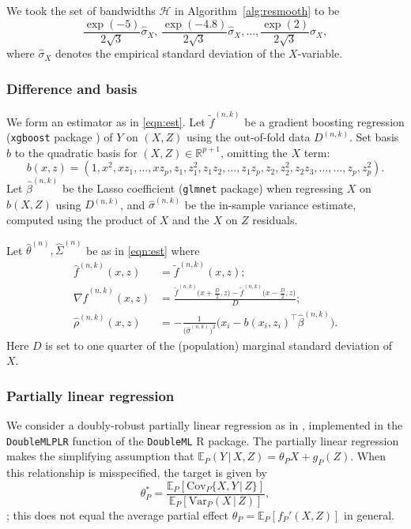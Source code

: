 \documentclass[aos]{imsart}
\newcommand{\R}{\mathbb{R}}
\newcommand{\E}{\mathbb{E}}
\newcommand{\Cov}{\mathrm{Cov}}
\newcommand{\Var}{\mathrm{Var}}
\newcommand{\given}{\,|\,}
\begin{document}
	We took the set of bandwidths $\mathcal{H}$ in Algorithm~\ref{alg:resmooth} to be
	\[
	\frac{\exp(-5)}{2\sqrt{3}} \hat{\sigma}_X, \, \frac{\exp(-4.8)}{2\sqrt{3}} \hat{\sigma}_X, \ldots, \frac{\exp(2)}{2\sqrt{3}} \hat{\sigma}_X,
	\]
	where $\hat{\sigma}_X$ denotes the empirical standard deviation of the $X$-variable.
	
	\subsubsection{Difference and basis}
	\label{sect:methodchern}
	
	We form an estimator as in \eqref{eqn:est}. Let $\tilde f^{(n,k)}$ be a gradient boosting regression (\texttt{xgboost} package \citep{xgboost}) of $Y$ on $(X,Z)$ using the out-of-fold data $D^{(n,k)}$. Set basis $b$ to the quadratic basis for $(X,Z)\in\R^{p+1}$, omitting the $X$ term:\begin{equation*}
		b(x,z) = (1, x^2, x z_1, \ldots,x z_{p}, z_1, z_1^2, z_1 z_2,\ldots, z_1 z_{p}, z_2, z_2^2, z_2 z_3,\ldots,\ldots, z_{p}, z_{p}^2).
	\end{equation*}
	Let $\hat \beta^{(n,k)}$ be the Lasso coefficient (\texttt{glmnet} package) when regressing $X$ on $b(X,Z)$ using $D^{(n,k)}$, and $\hat\sigma^{(n,k)}$ be the in-sample variance estimate, computed using the product of $X$ and the $X$ on $Z$ residuals.
	
	Let $\hat \theta^{(n)}, \hat\Sigma^{(n)}$ be as in \eqref{eqn:est} where \begin{align}
		\hat f^{(n,k)}(x,z) &= \tilde f^{(n,k)}(x,z); \label{eqn:original}\\
		\nabla \hat f^{(n,k)}(x,z) &= \frac{\tilde f^{(n,k)}\big(x+\frac D2,z\big)- \tilde f^{(n,k)}\big(x-\frac D2,z\big)}{D} ; \label{eqn:difference}\\
		\hat \rho^{(n,k)}(x,z) &= -\frac1{\big(\hat\sigma^{(n,k)}\big)^2}\Big(x_i - b(x_i,z_i)^{\top} \hat\beta^{(n,k)}\Big). \label{eqn:basisscore}
	\end{align}
	Here $D$ is set to one quarter of the (population) marginal standard deviation of $X$.
	
	
	\subsubsection{Partially linear regression}
	\label{sect:methodpl}
	
	We consider a doubly-robust partially linear regression as in \citet[\S 4.1]{ChernozhukovTreatment}, implemented in the \texttt{DoubleMLPLR} function of the \texttt{DoubleML} R package. The partially linear regression makes the simplifying assumption that $\E_P(Y\given  X, Z)  =  \theta_P X + g_P(Z)$. When this relationship is misspecified, the target is given by
	\begin{equation}
		\theta_P^* = \frac{\E_P[\Cov_P\{X, Y \given  Z\}]}{\E_P[\Var_P(X\given  Z)]} \label{eqn:partiallylinearparameter},
	\end{equation}
	\citep{VansteelandtLean}; this does not equal the average partial effect $\theta_P = \E_P[f_P'(X,Z)]$ in general.
	
\end{document}
